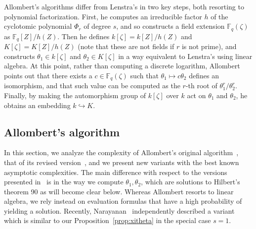 \documentclass{mcom-l}
\theoremstyle{plain}
\theoremstyle{definition}
\newcommand{\F}{\ensuremath{\mathbb{F}}}
\newcounter{algorithm}
\begin{document}
Allombert's algorithms differ from Lenstra's in two key steps, both
resorting to polynomial factorization.
First, he computes an irreducible factor $h$ of the cyclotomic
polynomial $\Phi_r$ of degree $s$,
and so constructs a field extension $\F_q(\zeta)$ as $\F_q[Z]/h(Z)$.
Then he defines $k[\zeta]=k[Z]/h(Z)$ and $K[\zeta]=K[Z]/h(Z)$
(note that these are not fields if $r$ is not prime), and constructs
$\theta_1\in k[\zeta]$ and $\theta_2\in K[\zeta]$ in a way equivalent
to Lenstra's using linear algebra. 
At this point, rather than computing a discrete
logarithm, Allombert points out that there exists a $c\in\F_q(\zeta)$
such that $\theta_1\mapsto c\theta_2$ defines an isomorphism,
and that such value can be
computed as the $r$-th root of $\theta_1^r/\theta_2^r$.
Finally, by making the automorphism group of $k[\zeta]$ over $k$ act
on $\theta_1$ and $\theta_2$, he obtains an embedding $k \hookrightarrow K$.%


\subsection{Allombert's algorithm}
\label{sec:fast-kummer}

In this section, we analyze the complexity of Allombert's original
algorithm~\cite{Allombert02}, that of its revised version~\cite{Allombert02-rev},
and we present new variants with the best known asymptotic complexities.
The main difference with respect to the 
versions presented in~\cite{Allombert02,Allombert02-rev} is in the way
we compute $\theta_1, \theta_2$, which are solutions to Hilbert's theorem 90
as will become clear below.
Whereas Allombert resorts to linear algebra, we rely instead on evaluation
formulas that have a high probability of yielding a solution.
Recently, Narayanan~\cite[Sec.~3]{narayanan2016fast} independently described 
a variant which is similar to our Proposition~\ref{prop:xitheta}
in the special case $s=1$.
\end{document}

